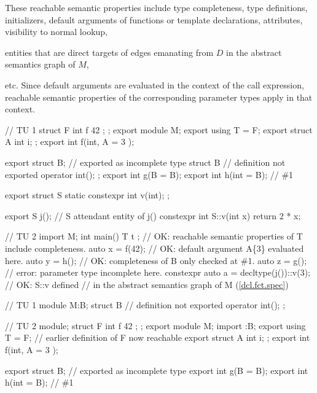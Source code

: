 \begin{std.txt}
\begin{after}
\alinea
\end{after}
  \enternote
  These reachable semantic properties include type completeness, 
  type definitions, initializers,
  default arguments of functions or template declarations, attributes,
  visibility to normal lookup,
\begin{before}\color{addclr}
  entities that are direct targets of edges 
  emanating from $D$ in the abstract semantics graph of $M$,
\end{before}
  etc.
  Since default arguments are evaluated in the context of the call expression,
  reachable semantic properties of the corresponding parameter types apply in 
  that context. 
  \begin{example}
\begin{before}\color{addclr}
\begin{codeblock}
// TU 1
struct F { int f { 42 }; };
export module M;
export using T = F;
export struct A { int i; };
export int f(int, A = { 3 });

export struct B;      // exported as incomplete type
struct B {            // definition not exported
  operator int();
};
export int g(B = B{});
export int h(int = B{}); // \#1

export struct S {
  static constexpr int v(int);
};

export S j();       // S attendant entity of j()
constexpr int S::v(int x) { return 2 * x; }


// TU 2
import M;
int main() {
  T t { };             // OK: reachable semantic properties of T include completeness. 
  auto x = f(42);      // OK: default argument A\{3\} evaluated here.
  auto y = h();        // OK: completeness of B only checked at \#1.
  auto z = g();        // error: parameter type incomplete here.
  constexpr auto a = decltype(j())::v(3); // OK: S::v defined 
                      // in the abstract semantics graph of M (\ref{dcl.fct.spec})
}
\end{codeblock}
\end{before}
\begin{after}\color{addclr}
\begin{codeblock}
// TU 1
module M:B;
struct B {                // definition not exported
  operator int();
};

// TU 2
module;
struct F { int f { 42 }; };
export module M;
import :B;
export using T = F;       // earlier definition of F now reachable
export struct A { int i; };
export int f(int, A = { 3 });

export struct B;          // exported as incomplete type
export int g(B = B{});
export int h(int = B{});  // \#1


\end{codeblock}
\end{after}
\end{example}
\end{std.txt}
